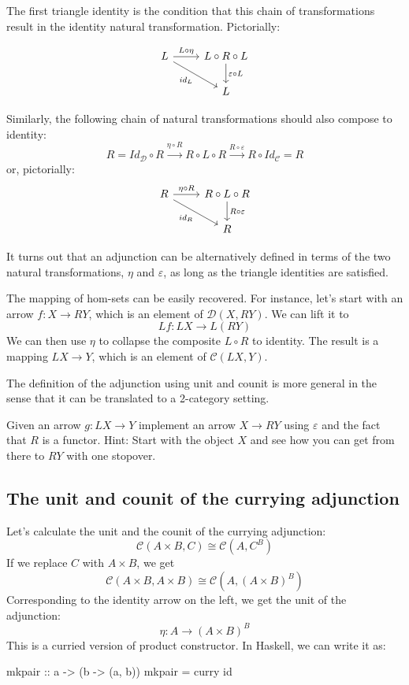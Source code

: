 \documentclass[DaoFP]{subfiles}
\begin{document}
The first triangle identity is the condition that this chain of transformations result in the identity natural transformation. Pictorially:

\[
 \begin{tikzcd}
 L
 \arrow[r, "L \circ \eta"]
 \arrow[rd, "id_L"']
 & L \circ R \circ L
 \arrow[d, "\varepsilon \circ L"]
 \\
 & L
  \end{tikzcd}
\]

Similarly, the following chain of natural transformations should also compose to identity:
\[ R = Id_{\mathcal{D}} \circ R \xrightarrow{\eta \circ R} R \circ L \circ R \xrightarrow{R \circ \varepsilon} R \circ Id_{\mathcal{C}} = R \]
or, pictorially:
\[
 \begin{tikzcd}
 R
 \arrow[r, "\eta \circ R"]
 \arrow[rd, "id_R"']
 & R \circ L \circ R
 \arrow[d, "R \circ \varepsilon"]
 \\
 & R
  \end{tikzcd}
\]

It turns out that an adjunction can be alternatively defined in terms of the two natural transformations, $\eta$ and $\varepsilon$, as long as the  triangle identities are satisfied. 

The mapping of hom-sets can be easily recovered. For instance, let's start with an arrow $f \colon X \to R Y$, which is an element of $\mathcal{D}( X , R Y)$. We can lift it to 
\[L f \colon L X \to L (R Y)\]
We can then use $\eta$ to collapse the composite $L \circ R$ to identity. The result is a mapping $L X \to Y$, which is an element of $ \mathcal{C} (L X, Y)$.


The definition of the adjunction using unit and counit is more general in the sense that it can be translated to a 2-category setting. 

\begin{exercise}
Given an arrow $g \colon L X \to Y$ implement an arrow $X \to R Y$ using $\varepsilon$ and the fact that $R$ is a functor. Hint: Start with the object $X$ and see how you can get from there to $R Y$ with one stopover.
\end{exercise}

\subsection{The unit and counit of the currying adjunction}

Let's calculate the unit and the counit of the currying adjunction:
\[  \mathcal{C}(A \times B, C ) \cong  \mathcal{C} (A, C^B)  \]
If we replace $C$ with $A \times B$, we get
\[  \mathcal{C}(A \times B, A \times B ) \cong  \mathcal{C} (A, (A \times B)^B)  \]
Corresponding to the identity arrow on the left, we get the unit of the adjunction:
\[ \eta \colon A \to (A \times B)^B \]
This is a curried version of product constructor. In Haskell, we can write it as:
\begin{haskell}
mkpair :: a -> (b -> (a, b))
mkpair = curry id
\end{haskell}
\end{document}
